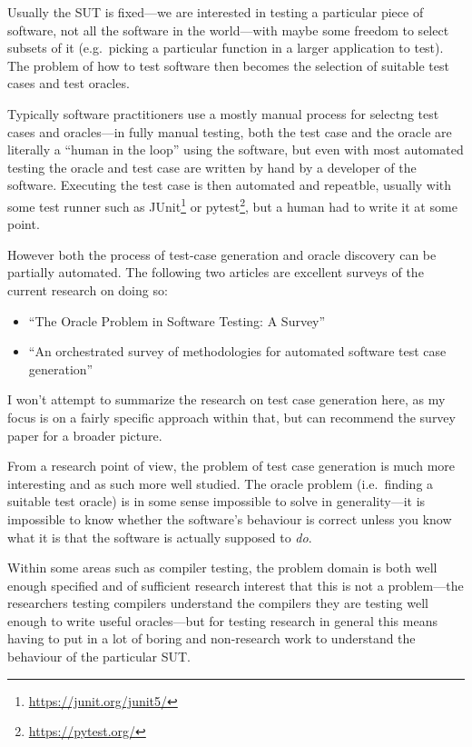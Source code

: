 Usually the SUT is fixed---we are interested in testing a particular piece of software,
not all the software in the world---with
maybe some freedom to select subsets of it (e.g.\ picking a particular function in a larger application to test).
The problem of how to test software then becomes the selection of suitable test cases and test oracles.

Typically software practitioners use a mostly manual process for selectng test cases and oracles---in
fully manual testing,
both the test case and the oracle are literally a ``human in the loop'' using the software,
but even with most automated testing the oracle and test case are written by hand by a developer of the software.
Executing the test case is then automated and repeatble, usually with some test runner such as JUnit\footnote{\url{https://junit.org/junit5/}} or pytest\footnote{\url{https://pytest.org/}},
but a human had to write it at some point.

However both the process of test-case generation and oracle discovery can be partially automated.
The following two articles are excellent surveys of the current research on doing so:

\begin{itemize}
\item ``The Oracle Problem in Software Testing: {A} Survey''\cite{DBLP:journals/tse/BarrHMSY15}
\item ``An orchestrated survey of methodologies for automated software test case generation''\cite{DBLP:journals/jss/AnandBCCCGHHMOE13}
\end{itemize}

I won't attempt to summarize the research on test case generation here,
as my focus is on a fairly specific approach within that,
but can recommend the survey paper for a broader picture.

From a research point of view,
the problem of test case generation is much more interesting and as such more well studied.
The oracle problem (i.e.\ finding a suitable test oracle) is in some sense impossible to solve in generality---it
is impossible to know whether the software's behaviour is correct unless you know what it is that the software is actually supposed to \emph{do}.

Within some areas such as compiler testing\cite{DBLP:conf/pldi/YangCER11, DBLP:conf/icse/DonaldsonL16},
the problem domain is both well enough specified and of sufficient research interest that this is not a problem---the
researchers testing compilers understand the compilers they are testing well enough to write useful oracles---but
for testing research in general this means having to put in a lot of boring and non-research work to understand the behaviour of the particular SUT.

